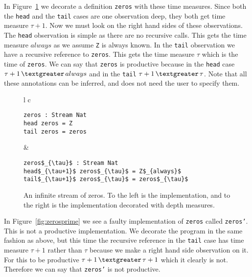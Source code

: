 In Figure~\ref{fig:zeros} we decorate a definition \texttt{zeros} with these time measures. Since both the \texttt{head} and the \texttt{tail} cases are one observation deep, they both get time measure $\tau+1$. Now we must look on the right hand sides of these observations. The \texttt{head} observation is simple as there are no recursive calls. This gets the time measure $always$ as we assume \texttt{Z} is always known. In the \texttt{tail} observation we have a recursive reference to \texttt{zeros}. This gets the time measure $\tau$ which is the time of \texttt{zeros}. We can say that \texttt{zeros} is productive because in the \texttt{head} case $\tau+1\,\textgreater\,always$ and in the \texttt{tail} $\tau+1\,\textgreater\,\tau$. Note that all these annotations can be inferred, and does not need the user to specify them.

\begin{figure}
\begin{tabular}{l c}
\begin{minipage}{3in}
\begin{Verbatim}[commandchars=\\\{\},codes={\catcode`$=3\catcode`_=8}]
zeros : Stream Nat
head zeros = Z
tail zeros = zeros
\end{Verbatim}
\end{minipage} &
\begin{minipage}{3in}
\begin{Verbatim}[commandchars=\\\{\},codes={\catcode`$=3\catcode`_=8}]
zeros$_{\tau}$ : Stream Nat
head$_{\tau+1}$ zeros$_{\tau}$ = Z$_{always}$
tail$_{\tau+1}$ zeros$_{\tau}$ = zeros$_{\tau}$
\end{Verbatim}
\end{minipage}
\end{tabular}
\caption{An infinite stream of zeros. To the left is the implementation, and to the right is the implementation decorated with depth measures.}
\label{fig:zeros}
\end{figure}

In Figure~\ref{fig:zerosprime} we see a faulty implementation of \texttt{zeros} called \texttt{zeros'}. This is not a productive implementation. We decorate the program in the same fashion as above, but this time the recursive reference in the \texttt{tail} case has time measure $\tau+1$ rather than $\tau$ because we make a right hand side observation on it. For this to be productive $\tau+1\,\textgreater\,\tau+1$ which it clearly is not. Therefore we can say that \texttt{zeros'} is not productive.

